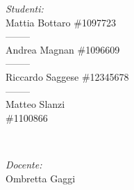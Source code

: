 \begin{titlepage}
\begin{minipage}{0.4\textwidth}
\begin{flushleft} \large
\emph{Studenti:}\\
Mattia Bottaro \#1097723 \\--------\\ Andrea Magnan \#1096609 \\--------\\ Riccardo Saggese \#12345678 \\--------\\ Matteo Slanzi \\ \#1100866
\end{flushleft}
\end{minipage}
~
\begin{minipage}{0.4\textwidth}
\begin{flushright} \large
\emph{Docente:} \\
Ombretta Gaggi
\end{flushright}
\end{minipage}\\[2cm]





 

\vfill %

\end{titlepage}

\newpage
\tableofcontents
\listoffigures
\listoftables
\newpage


